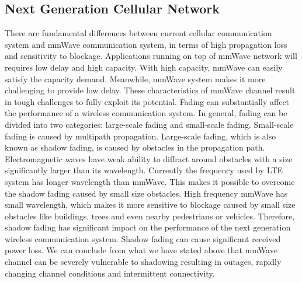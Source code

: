 \subsection{Next Generation Cellular Network}
\par There are fundamental differences between current cellular communication system and mmWave communication system, in terms of high propagation loss and sensitivity to blockage. Applications running on top of mmWave network will requires low delay and high capacity. With high capacity, mmWave can easily satisfy the capacity demand. Meanwhile, mmWave system makes it more challenging to provide low delay. These characteristics of mmWave channel result in tough challenges to fully exploit its potential. Fading can substantially affect the performance of a wireless communication system. In general, fading can be divided into two categories: large-scale fading and small-scale fading. Small-scale fading is caused by multipath propagation. Large-scale fading, which is also known as shadow fading, is caused by obstacles in the propagation path. Electromagnetic waves have weak ability to diffract around obstacles with a size significantly larger than its wavelength. Currently the frequency used by LTE system has longer wavelength than mmWave. This makes it possible to overcome the shadow fading caused by small size obstacles. High frequency mmWave has small wavelength, which makes it more sensitive to blockage caused by small size obstacles like buildings, trees and even nearby pedestrians or vehicles. Therefore, shadow fading has significant impact on the performance of the next generation wireless communication system. Shadow fading can cause significant received power loss. We can conclude from what we have stated above that mmWave channel can be severely vulnerable to shadowing resulting in outages, rapidly changing channel conditions and intermittent connectivity. 

